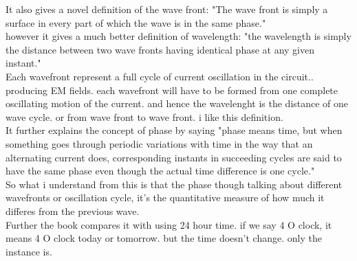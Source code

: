 \documentclass[12pt]{article}
\begin{document}
It also gives a novel definition of the wave front: "The wave front is simply a surface in every part of which the wave is in the same phase."\\
however it gives a much better definition of wavelength: "the wavelength is simply the distance between two wave fronts having identical phase at any given instant." 
\\Each wavefront represent a full cycle of current oscillation in the circuit.. producing EM fields. each wavefront will have to be formed from one complete oscillating motion of the current. and hence the wavelenght is the distance of one wave cycle. or from wave front to wave front. i like this definition. 
\\It further explains the concept of phase by saying "phase means time, but when something goes through periodic variations with time in the way that an alternating current does, corresponding instants in succeeding cycles are said to have the same phase even though the actual time difference is one cycle."
\\So what i understand from this is that the phase though talking about different wavefronts or oscillation cycle, it's the quantitative measure of how much it differes from the previous wave. 
\\Further the book compares it with using 24 hour time. if we say 4 O clock, it means 4 O clock today or tomorrow. but the time doesn't change. only the instance is. 
\end{document}
